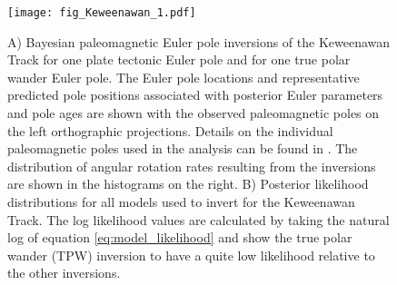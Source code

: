 \documentclass[11pt,letterpaper]{article}
\begin{document}
\begin{figure}
\centering
\texttt{[image: fig\_Keweenawan\_1.pdf]}
\caption{A) Bayesian paleomagnetic Euler pole inversions of the Keweenawan Track for one plate tectonic Euler pole and for one true polar wander Euler pole. The Euler pole locations and representative predicted pole positions associated with posterior Euler parameters and pole ages are shown with the observed paleomagnetic poles on the left orthographic projections. Details on the individual paleomagnetic poles used in the analysis can be found in \cite{Swanson-Hysell2019a}. The distribution of angular rotation rates resulting from the inversions are shown in the histograms on the right. B) Posterior likelihood distributions for all models used to invert for the Keweenawan Track. The log likelihood values are calculated by taking the natural log of equation \ref{eq:model_likelihood} and show the true polar wander (TPW) inversion to have a quite low likelihood relative to the other inversions.}
\label{fig:Keweenawan_Track_1}
\end{figure}
\end{document}
